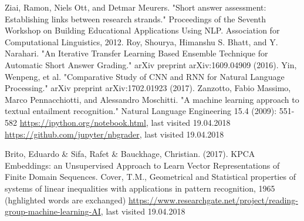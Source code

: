 \documentclass[rnd]{mas_report}
\begin{document}
\begin{thebibliography}{3}
 Ziai, Ramon, Niels Ott, and Detmar Meurers. "Short answer assessment: Establishing links between research strands." Proceedings of the Seventh Workshop on Building Educational Applications Using NLP. Association for Computational Linguistics, 2012.
 Roy, Shourya, Himanshu S. Bhatt, and Y. Narahari. "An Iterative Transfer Learning Based Ensemble Technique for Automatic Short Answer Grading." arXiv preprint arXiv:1609.04909 (2016).
 Yin, Wenpeng, et al. "Comparative Study of CNN and RNN for Natural Language Processing." arXiv preprint arXiv:1702.01923 (2017).
 Zanzotto, Fabio Massimo, Marco Pennacchiotti, and Alessandro Moschitti. "A machine learning approach to textual entailment recognition." Natural Language Engineering 15.4 (2009): 551-582
 \url{https://ipython.org/notebook.html}, last visited 19.04.2018
 \url{https://github.com/jupyter/nbgrader}, last visited 19.04.2018


 Brito, Eduardo \& Sifa, Rafet \& Bauckhage, Christian. (2017). KPCA Embeddings: an Unsupervised Approach to Learn Vector Representations of Finite Domain Sequences.
 Cover, T.M., Geometrical and Statistical properties of systems of linear inequalities with applications in pattern recognition, 1965 (hghlighted words are exchanged)
 \url{https://www.researchgate.net/project/reading-group-machine-learning-AI}, last visited 19.04.2018


\end{thebibliography}
\end{document}
